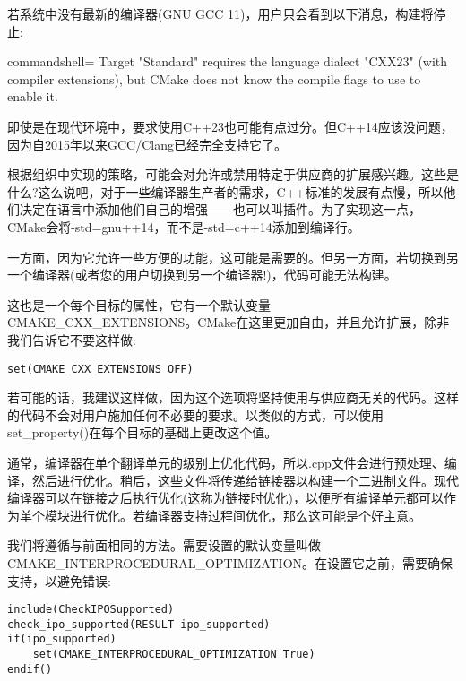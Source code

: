 若系统中没有最新的编译器(GNU GCC 11)，用户只会看到以下消息，构建将停止:

\begin{tcblisting}{commandshell={}}
Target "Standard" requires the language dialect "CXX23" (with
compiler extensions), but CMake does not know the compile flags
to use to enable it.
\end{tcblisting}

即使是在现代环境中，要求使用C++23也可能有点过分。但C++14应该没问题，因为自2015年以来GCC/Clang已经完全支持它了。


根据组织中实现的策略，可能会对允许或禁用特定于供应商的扩展感兴趣。这些是什么?这么说吧，对于一些编译器生产者的需求，C++标准的发展有点慢，所以他们决定在语言中添加他们自己的增强——也可以叫插件。为了实现这一点，CMake会将-std=gnu++14，而不是-std=c++14添加到编译行。

一方面，因为它允许一些方便的功能，这可能是需要的。但另一方面，若切换到另一个编译器(或者您的用户切换到另一个编译器!)，代码可能无法构建。

这也是一个每个目标的属性，它有一个默认变量CMAKE\_CXX\_EXTENSIONS。CMake在这里更加自由，并且允许扩展，除非我们告诉它不要这样做:

\begin{lstlisting}[style=styleCMake]
set(CMAKE_CXX_EXTENSIONS OFF)
\end{lstlisting}

若可能的话，我建议这样做，因为这个选项将坚持使用与供应商无关的代码。这样的代码不会对用户施加任何不必要的要求。以类似的方式，可以使用set\_property()在每个目标的基础上更改这个值。


通常，编译器在单个翻译单元的级别上优化代码，所以.cpp文件会进行预处理、编译，然后进行优化。稍后，这些文件将传递给链接器以构建一个二进制文件。现代编译器可以在链接之后执行优化(这称为链接时优化)，以便所有编译单元都可以作为单个模块进行优化。若编译器支持过程间优化，那么这可能是个好主意。

我们将遵循与前面相同的方法。需要设置的默认变量叫做CMAKE\_INTERPROCEDURAL\_OPTIMIZATION。在设置它之前，需要确保支持，以避免错误:

\begin{lstlisting}[style=styleCMake]
include(CheckIPOSupported)
check_ipo_supported(RESULT ipo_supported)
if(ipo_supported)
	set(CMAKE_INTERPROCEDURAL_OPTIMIZATION True)
endif()
\end{lstlisting}

